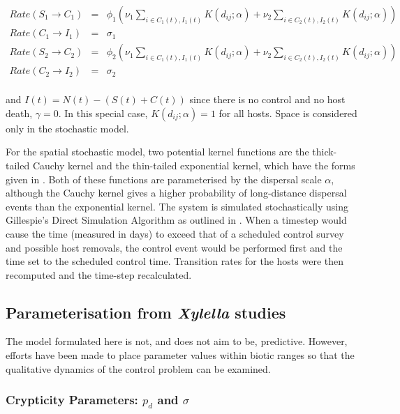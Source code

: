 \documentclass[prstpaper]{revtex4-2}
\begin{document}
\begin{eqnarray}    
Rate \left( S_{1} \rightarrow C_{1}\right) &=& \phi_{1} \left( \nu_{1} \sum_{i \in C_{1}(t), I_{1}(t)}^{} K(d_{ij}; \alpha) + \nu_{2} \sum_{i \in C_{2}(t), I_{2}(t)}^{} K(d_{ij}; \alpha) \right) \\
   Rate \left( C_{1} \rightarrow I_{1}\right)  &=&  \sigma_{1} \\
    Rate \left( S_{2} \rightarrow C_{2}\right) &=& \phi_{2} \left( \nu_{1} \sum_{i \in C_{1}(t), I_{1}(t)}^{} K(d_{ij}; \alpha) + \nu_{2} \sum_{i \in C_{2}(t), I_{2}(t)}^{} K(d_{ij}; \alpha) \right) \\
   Rate \left( C_{2} \rightarrow I_{2}\right) &=&  \sigma_{2} \\
\end{eqnarray}

and $I(t) = N(t) - (S(t) + C(t))$ since there is no control and no host death, $\gamma = 0$. In this special case, $K(d_{ij}; \alpha) = 1$ for all hosts. Space is considered only in the stochastic model.

For the spatial stochastic model,  two potential kernel functions are the thick-tailed Cauchy kernel and the thin-tailed exponential kernel, which have the forms given in \cite{HyattTwynham2017}. Both of these functions are parameterised by the dispersal scale $\alpha$, although the Cauchy kernel gives a higher probability of long-distance dispersal events than the exponential kernel.
The system is simulated stochastically using Gillespie's Direct Simulation Algorithm as outlined in \cite{Keeling2008}. When a timestep would cause the time (measured in days) to exceed that of a scheduled control survey and possible host removals, the control event would be performed first and the time set to the scheduled control time. Transition rates for the hosts were then recomputed and the time-step recalculated.  

\subsection{Parameterisation from \emph{Xylella} studies}

The model formulated here is not, and does not aim to be, predictive. However, efforts have been made to place parameter values within biotic ranges so that the qualitative dynamics of the control problem can be examined. 

\subsubsection{Crypticity Parameters: $p_{d}$ and $\sigma$}
\end{document}
